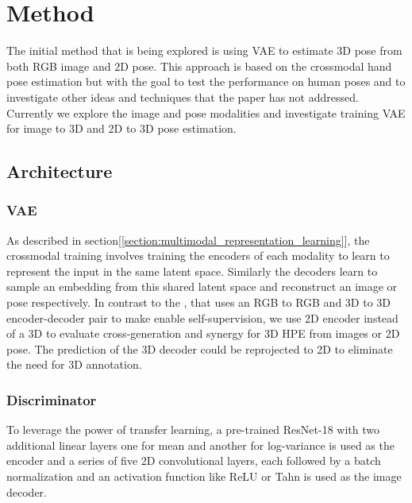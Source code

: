\chapter{Method}
The initial method that is being explored is using \ac{VAE} to estimate 3D pose from both RGB image and 2D pose. This approach is based on the crossmodal hand pose estimation \cite{crossmodal} but with the goal to test the performance on human poses and to investigate other ideas and techniques that the paper has not addressed. Currently we explore the image and pose modalities and investigate training \ac{VAE} for image to 3D and 2D to 3D pose estimation.


\section{Architecture}
\subsection{VAE} %
As described in section[\ref{section:multimodal_representation_learning}], the crossmodal training involves training the encoders of each modality to learn to represent the input in the same latent space. Similarly the decoders learn to sample an embedding from this shared latent space and reconstruct an image or pose respectively. In contrast to the \cite{crossmodal}, that uses an RGB to RGB and 3D to 3D encoder-decoder pair to make enable self-supervision, we use 2D encoder instead of a 3D to evaluate cross-generation and synergy for 3D \ac{HPE} from images or 2D pose. The prediction of the 3D decoder could be reprojected to 2D to eliminate the need for 3D annotation.

\subsection{Discriminator}%
To leverage the power of transfer learning, a pre-trained ResNet-18 \cite{resnet} with two additional linear layers one for mean and another for log-variance is used as the encoder and a series of five 2D convolutional layers, each followed by a batch normalization and an activation function like ReLU or Tahn is used as the image decoder.


